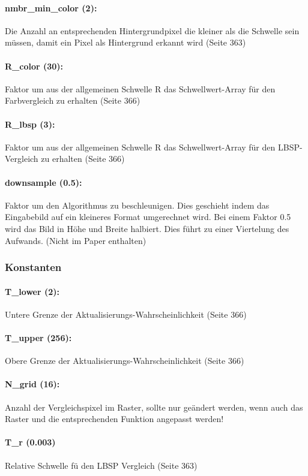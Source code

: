 \documentclass{article}
\begin{document}
	\paragraph*{nmbr\_min\_color (2):} Die Anzahl an entsprechenden Hintergrundpixel die kleiner als die Schwelle sein m\"ussen, damit ein Pixel als Hintergrund erkannt wird (Seite 363)
	\paragraph*{R\_color (30):} Faktor um aus der allgemeinen Schwelle R das Schwellwert-Array f\"ur den Farbvergleich zu erhalten (Seite 366)
	\paragraph*{R\_lbsp (3):} Faktor um aus der allgemeinen Schwelle R das Schwellwert-Array f\"ur den LBSP-Vergleich zu erhalten (Seite 366)
	\paragraph*{downsample (0.5):} Faktor um den Algorithmus zu beschleunigen. Dies geschieht indem das Eingabebild auf ein kleineres Format umgerechnet wird. Bei einem Faktor 0.5 wird das Bild in H\"ohe und Breite halbiert. Dies f\"uhrt zu einer Viertelung des Aufwands. (Nicht im Paper enthalten)

	\subsubsection*{Konstanten}
	\label{ssub:konstanten}

	
	\paragraph*{T\_lower (2):} Untere Grenze der Aktualisierungs-Wahrscheinlichkeit (Seite 366)
	\paragraph*{T\_upper (256):} Obere Grenze der Aktualisierungs-Wahrscheinlichkeit (Seite 366)
	\paragraph*{N\_grid (16):} Anzahl der Vergleichspixel im Raster, sollte nur ge\"andert werden, wenn auch das Raster und die entsprechenden Funktion angepasst werden!
	\paragraph*{T\_r (0.003)} Relative Schwelle f\"u den LBSP Vergleich (Seite 363)
\end{document}
